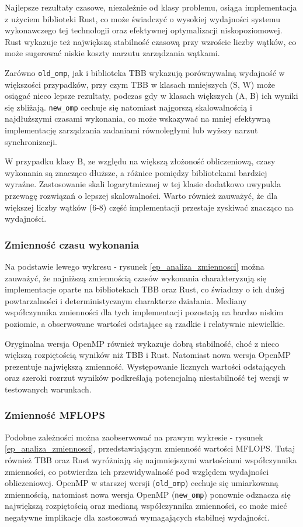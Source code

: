 Najlepsze rezultaty czasowe, niezależnie od klasy problemu, osiąga implementacja z użyciem biblioteki Rust, co może świadczyć o wysokiej wydajności systemu wykonawczego tej technologii oraz efektywnej optymalizacji niskopoziomowej. Rust wykazuje też największą stabilność czasową przy wzroście liczby wątków, co może sugerować niskie koszty narzutu zarządzania wątkami.

Zarówno \texttt{old\_omp}, jak i biblioteka TBB wykazują porównywalną wydajność w większości przypadków, przy czym TBB w klasach mniejszych (S, W) może osiągać nieco lepsze rezultaty, podczas gdy w klasach większych (A, B) ich wyniki się zbliżają. \texttt{new\_omp} cechuje się natomiast najgorszą skalowalnością i najdłuższymi czasami wykonania, co może wskazywać na mniej efektywną implementację zarządzania zadaniami równoległymi lub wyższy narzut synchronizacji.

W przypadku klasy B, ze względu na większą złożoność obliczeniową, czasy wykonania są znacząco dłuższe, a różnice pomiędzy bibliotekami bardziej wyraźne. Zastosowanie skali logarytmicznej w tej klasie dodatkowo uwypukla przewagę rozwiązań o lepszej skalowalności. Warto również zauważyć, że dla większej liczby wątków (6-8) część implementacji przestaje zyskiwać znacząco na wydajności.

\subsubsection{Zmienność czasu wykonania}
Na podstawie lewego wykresu - rysunek \ref{ep_analiza_zmiennosci} można zauważyć, że najniższą zmiennością czasów wykonania charakteryzują się implementacje oparte na bibliotekach TBB oraz Rust, co świadczy o ich dużej powtarzalności i deterministycznym charakterze działania. Mediany współczynnika zmienności dla tych implementacji pozostają na bardzo niskim poziomie, a obserwowane wartości odstające są rzadkie i relatywnie niewielkie.

Oryginalna wersja OpenMP również wykazuje dobrą stabilność, choć z nieco większą rozpiętością wyników niż TBB i Rust. Natomiast nowa wersja OpenMP prezentuje największą zmienność. Występowanie licznych wartości odstających oraz szeroki rozrzut wyników podkreślają potencjalną niestabilność tej wersji w testowanych warunkach.

\subsubsection{Zmienność MFLOPS}
Podobne zależności można zaobserwować na prawym wykresie - rysunek \ref{ep_analiza_zmiennosci}, przedstawiającym zmienność wartości MFLOPS. Tutaj również TBB oraz Rust wyróżniają się najmniejszymi wartościami współczynnika zmienności, co potwierdza ich przewidywalność pod względem wydajności obliczeniowej. OpenMP w starszej wersji (\texttt{old\_omp}) cechuje się umiarkowaną zmiennością, natomiast nowa wersja OpenMP (\texttt{new\_omp}) ponownie odznacza się największą rozpiętością oraz medianą współczynnika zmienności, co może mieć negatywne implikacje dla zastosowań wymagających stabilnej wydajności.



